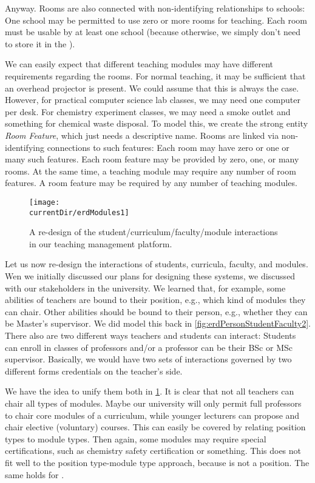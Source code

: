 Anyway.
Rooms are also connected with non-identifying relationships to schools:
One school may be permitted to use zero or more rooms for teaching.
Each room must be usable by at least one school (because otherwise, we simply don't need to store it in the \db).

We can easily expect that different teaching modules may have different requirements regarding the rooms.
For normal teaching, it may be sufficient that an overhead projector is present.
We could assume that this is always the case.
However, for practical computer science lab classes, we may need one computer per desk.
For chemistry experiment classes, we may need a smoke outlet and something for chemical waste disposal.
To model this, we create the strong entity \emph{Room Feature}, which just needs a descriptive name.
Rooms are linked via non-identifying connections to such features:
Each room may have zero or one or many such features.
Each room feature may be provided by zero, one, or many rooms.
At the same time, a teaching module may require any number of room features.
A room feature may be required by any number of teaching modules.

\begin{figure}%
\centering%
\texttt{[image: \\currentDir/erdModules1]}%
\caption{A re-design of the student/curriculum/faculty/module interactions in our teaching management platform.}%
\label{fig:erdModules1}%
\end{figure}%
%
Let us now re-design the interactions of students, curricula, faculty, and modules.
Wen we initially discussed our plans for designing these systems, we discussed with our stakeholders in the university.
We learned that, for example, some abilities of teachers are bound to their position, e.g., which kind of modules they can chair.
Other abilities should be bound to their person, e.g., whether they can be Master's supervisor.
We did model this back in \cref{fig:erdPersonStudentFaculty2}.
There also are two different ways teachers and students can interact:
Students can enroll in classes of professors and/or a professor can be their BSc or MSc supervisor.
Basically, we would have two sets of interactions governed by two different forms credentials on the teacher's side.

We have the idea to unify them both in \cref{fig:erdModules1}.
It is clear that not all teachers can chair all types of modules.
Maybe our university will only permit full professors to chair core modules of a curriculum, while younger lecturers can propose and chair elective (voluntary) courses.
This can easily be covered by relating position types to module types.
Then again, some modules may require special certifications, such as chemistry safety certification or something.
This does not fit well to the position type-module type approach, because  is not a position.
The same holds for .

